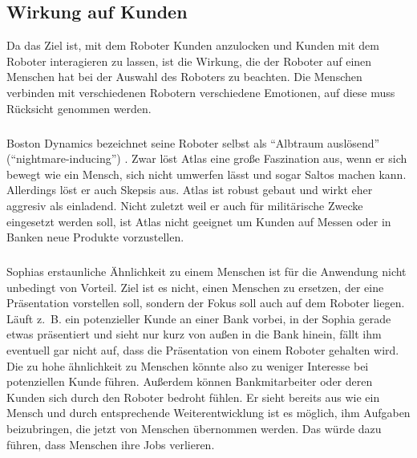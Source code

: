 
\subsection{Wirkung auf Kunden}
Da das Ziel ist, mit dem Roboter Kunden anzulocken und Kunden mit dem Roboter
interagieren zu lassen, ist die Wirkung, die der Roboter auf einen Menschen hat
bei der Auswahl des Roboters zu beachten. 
Die Menschen verbinden mit verschiedenen Robotern verschiedene Emotionen, auf
diese muss Rücksicht genommen werden.

\subparagraph{}
Boston Dynamics bezeichnet seine Roboter selbst als "`Albtraum auslösend"'
("`night\-mare-\-in\-du\-cing"') \cite{Guardian2018}. Zwar löst Atlas eine große
Faszination aus, wenn er sich bewegt wie ein Mensch, sich nicht umwerfen lässt
und sogar Saltos machen kann. Allerdings löst er auch Skepsis aus. Atlas ist
robust gebaut und wirkt eher aggresiv als einladend. Nicht zuletzt weil er auch
für militärische Zwecke eingesetzt werden soll, ist Atlas nicht geeignet um
Kunden auf Messen oder in Banken neue Produkte vorzustellen.

\subparagraph{}
Sophias erstaunliche Ähnlichkeit zu einem Menschen ist für die Anwendung nicht
unbedingt von Vorteil. Ziel ist es nicht, einen Menschen zu ersetzen, der eine
Präsentation vorstellen soll, sondern der Fokus soll auch auf dem Roboter
liegen. Läuft z.~B. ein potenzieller Kunde an einer Bank vorbei, in der Sophia
gerade etwas präsentiert und sieht nur kurz von außen in die Bank hinein, fällt
ihm eventuell gar nicht auf, dass die Präsentation von einem Roboter gehalten
wird. Die zu hohe ähnlichkeit zu Menschen könnte also zu weniger Interesse bei
potenziellen Kunde führen. Außerdem können Bankmitarbeiter oder deren Kunden
sich durch den Roboter bedroht fühlen. Er sieht bereits aus wie ein Mensch und
durch entsprechende Weiterentwicklung ist es möglich, ihm Aufgaben beizubringen,
die jetzt von Menschen übernommen werden. Das würde dazu führen, dass Menschen
ihre Jobs verlieren.

